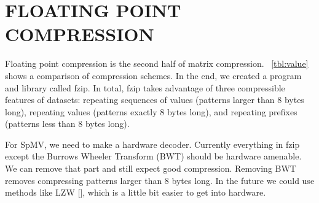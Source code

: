 \chapter{FLOATING POINT COMPRESSION}
\label{chp:fzip}
\newif\ifshort

\shorttrue

\newif\ifbwtsec

\bwtsecfalse
Floating point compression is the second half of matrix compression. \figurename~\ref{tbl:value} shows a comparison of compression schemes. In the end, we created a program and library called fzip. In total, fzip takes advantage of three compressible features of datasets: repeating sequences of values (patterns larger than 8 bytes long), repeating values (patterns exactly 8 bytes long), and repeating prefixes (patterns less than 8 bytes long). \par
For SpMV, we need to make a hardware decoder. Currently everything in fzip except the Burrows Wheeler Transform (BWT) should be hardware amenable. We can remove that part and still expect good compression. Removing BWT removes compressing patterns larger than 8 bytes long. In the future we could use methods like LZW [\cite{prelim:welch}], which is a little bit easier to get into hardware.
